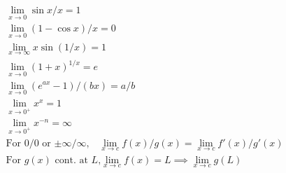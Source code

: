 \documentclass{rbt-mathnotes-formula-sheet}
\begin{document}
\begin{gather*}
  \lim_{x \to 0} \sin x/x = 1 \\
  \lim_{x \to 0} (1-\cos x)/x = 0 \\
  \lim_{x \to \infty} x \sin(1/x) = 1 \\
  \lim_{x \to 0} (1+x)^{1/x} = e \\
  \lim_{x \to 0} (e^{ax}-1)/(bx) = a/b \\
  \lim_{x \to 0^+} x^x = 1 \\
  \lim_{x \to 0^+} x^{-n} = \infty \\
  \text{For $0/0$ or $\pm\infty/\infty$,}\quad
  \lim_{x \to c} f(x)/g(x) = \lim_{x \to c} f'(x)/g'(x) \\
  \text{For $g(x)$ cont.\ at $L$,}
  \lim_{x \to c} f(x) = L \implies \lim_{x \to c} g(L)
\end{gather*}
\end{document}
